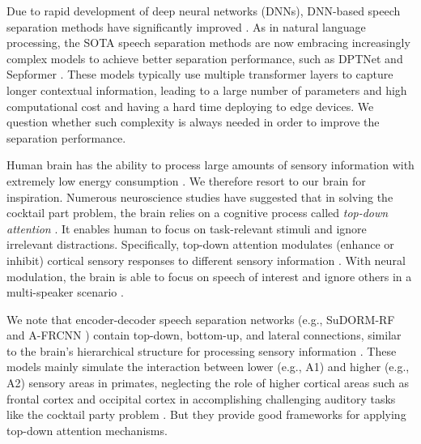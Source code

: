 \documentclass{article} \usepackage{iclr2023_conference,times}
\begin{document}
Due to rapid development of deep neural networks (DNNs), DNN-based speech separation methods have significantly improved \citep{luo2019conv, luo2020dual, tzinis2020sudo, Chen2020, subakan2021attention, hu2021speech, li2022design}. As in natural language processing, the SOTA speech separation methods are now embracing increasingly complex models to achieve better separation performance, such as DPTNet \citep{Chen2020} and Sepformer \citep{subakan2021attention}. These models typically use multiple transformer layers \citep{vaswani2017attention} to capture longer contextual information, leading to a large number of parameters and high computational cost and having a hard time deploying to edge devices. We question whether such complexity is always needed in order to improve the separation performance. 


Human brain has the ability to process large amounts of sensory information with extremely low energy consumption \citep{attwell2001energy, howarth2012updated}. We therefore resort to our brain for inspiration. Numerous neuroscience studies have suggested that in solving the cocktail part problem, the brain relies on a cognitive process called {\it top-down attention} \citep{wood1995cocktail,haykin2005cocktail,fernandez2015top}. It enables human to focus on task-relevant stimuli and ignore irrelevant distractions. Specifically, top-down attention modulates (enhance or inhibit) cortical sensory responses to different sensory information \citep{gazzaley2005top,johnson2005attention}. With neural modulation, the brain is able to focus on speech of interest and ignore others in a multi-speaker scenario \citep{mesgarani2012selective}.

We note that encoder-decoder speech separation networks (e.g., SuDORM-RF \citep{tzinis2020sudo} and A-FRCNN \citep{hu2021speech}) contain top-down, bottom-up, and lateral connections, similar to the brain's hierarchical structure for processing sensory information \citep{park2013structural}. These models mainly simulate the interaction between lower (e.g., A1) and higher (e.g., A2) sensory areas in primates, neglecting the role of higher cortical areas such as frontal cortex and occipital cortex in accomplishing challenging auditory tasks like the cocktail party problem \citep{bareham2018role, cohen2005auditory}. But they provide good frameworks for applying top-down attention mechanisms.
\end{document}
